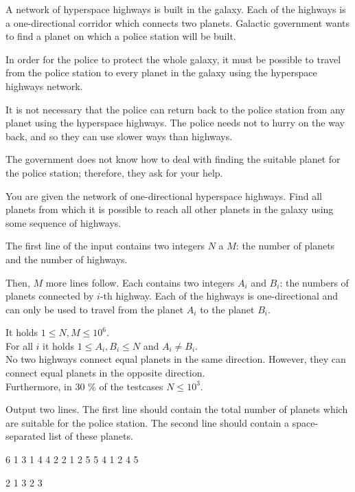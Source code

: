 





A network of hyperspace highways is built in the galaxy. Each of the highways
is a one-directional corridor which connects two planets. Galactic government
wants to find a planet on which a police station will be built.

In order for the police to protect the whole galaxy, it must be possible to
travel from the police station to every planet in the galaxy using the
hyperspace highways network.

It is not necessary that the police can return back to the police station from
any planet using the hyperspace highways. The police needs not to hurry on the
way back, and so they can use slower ways than highways.

The government does not know how to deal with finding the suitable planet for
the police station; therefore, they ask for your help.


You are given the network of one-directional hyperspace highways. Find all
planets from which it is possible to reach all other planets in the galaxy using
some sequence of highways.


The first line of the input contains two integers $N$ a $M$: the number of
planets and the number of highways.

Then, $M$ more lines follow. Each contains two integers $A_i$ and $B_i$: the
numbers of planets connected by $i$-th highway. Each of the highways is
one-directional and can only be used to travel from the planet $A_i$ to the
planet $B_i$.

\bigskip
\noindent
It holds $1 \leq N, M \leq 10^6$.\\
For all $i$ it holds $1 \leq A_i, B_i \leq N$ and $A_i \neq B_i$.\\
No two highways connect equal planets in the same direction. However, they can
  connect equal planets in the opposite direction.\\
Furthermore, in 30 \% of the testcases $N \leq 10^3$.


Output two lines. The first line should contain the total number of planets
which are suitable for the police station. The second line should contain
a space-separated list of these planets.


 6
1 3
1 4
4 2
2 1
2 5
5 4
1 2 4 5
\sampleEND

 2
1 3
2 3
~
\sampleEND


